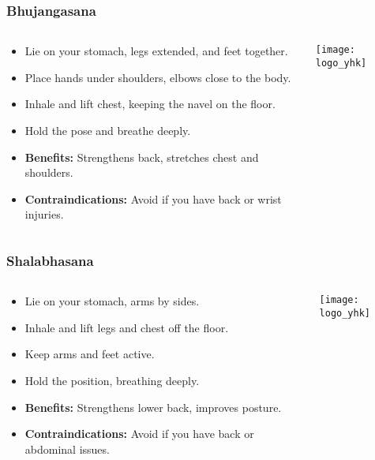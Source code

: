 \begin{frame}[fragile]\frametitle{Bhujangasana}
\begin{columns}
    \begin{column}[T]{0.5\linewidth}
      \begin{itemize}
        \item Lie on your stomach, legs extended, and feet together.
        \item Place hands under shoulders, elbows close to the body.
        \item Inhale and lift chest, keeping the navel on the floor.
        \item Hold the pose and breathe deeply.
        \item \textbf{Benefits:} Strengthens back, stretches chest and shoulders.
        \item \textbf{Contraindications:} Avoid if you have back or wrist injuries.
      \end{itemize}
    \end{column}
    \begin{column}[T]{0.5\linewidth}
        \begin{center}
        \texttt{[image: logo\_yhk]}
        \end{center}    
    \end{column}
  \end{columns}
\end{frame}

\begin{frame}[fragile]\frametitle{Shalabhasana}
\begin{columns}
    \begin{column}[T]{0.5\linewidth}
      \begin{itemize}
        \item Lie on your stomach, arms by sides.
        \item Inhale and lift legs and chest off the floor.
        \item Keep arms and feet active.
        \item Hold the position, breathing deeply.
        \item \textbf{Benefits:} Strengthens lower back, improves posture.
        \item \textbf{Contraindications:} Avoid if you have back or abdominal issues.
      \end{itemize}
    \end{column}
    \begin{column}[T]{0.5\linewidth}
        \begin{center}
        \texttt{[image: logo\_yhk]}
        \end{center}    
    \end{column}
  \end{columns}
\end{frame}

